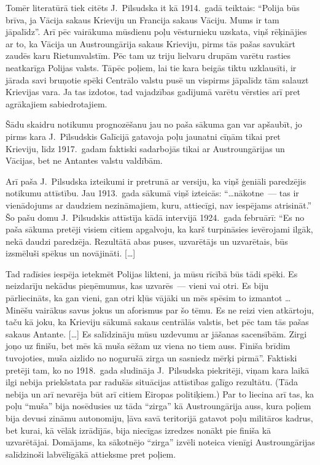 \documentclass[twoside,a5paper,12pt,fleqn,openany]{extbook}
\newcommand{\citespace}{[\dots{}]}
\begin{document}
Tomēr literatūrā tiek citēts J.~Pilsudska it kā 1914.~gadā teiktais: ``Polija būs brīva, ja Vācija sakaus Krieviju un Francija sakaus Vāciju. Mums ir tam jāpalīdz''. Arī pēc vairākuma mūsdienu poļu vēsturnieku uzskata, viņš rēķinājies ar to, ka Vācija un Austroungārija sakaus Krieviju, pirms tās pašas savukārt zaudēs karu Rietumvalstīm. Pēc tam uz triju lielvaru drupām varētu rasties neatkarīga Polijas valsts. Tāpēc poļiem, lai tie kara beigās tiktu uzklausīti, ir jārada savi bruņotie spēki Centrālo valstu pusē un vispirms jāpalīdz tām salauzt Krievijas vara. Ja tas izdotos, tad vajadzības gadījumā varētu vērsties arī pret agrākajiem sabiedrotajiem.

Šādu skaidru notikumu prognozēšanu jau no paša sākuma gan var apšaubīt, jo pirms kara J.~Pilsudskis Galīcijā gatavoja poļu jaunatni cīņām tikai pret Krieviju, līdz 1917.~gadam faktiski sadarbojās tikai ar Austroungārijas un Vācijas, bet ne Antantes valstu valdībām.

Arī paša J.~Pilsudska izteikumi ir pretrunā ar versiju, ka viņš ģeniāli paredzējis notikumu attīstību. Jau 1913.~gada sākumā viņš izteicās: ``\dots{}nākotne~--- tas ir vienādojums ar daudziem nezināmajiem, kuru, attiecīgi, nav iespējams atrisināt.'' Šo pašu domu J.~Pilsudskis attīstīja kādā intervijā 1924.~gada februārī: ``Es no paša sākuma pretēji visiem citiem apgalvoju, ka karš turpināsies ievērojami ilgāk, nekā daudzi paredzēja. Rezultātā abas puses, uzvarētājs un uzvarētais, būs izsmēluši spēkus un novājināti. \citespace{}

Tad radīsies iespēja ietekmēt Polijas likteni, ja mūsu rīcībā būs tādi spēki. Es neizdarīju nekādus pieņēmumus, kas uzvarēs~--- vieni vai otri. Es biju pārliecināts, ka gan vieni, gan otri kļūs vājāki un mēs spēsim to izmantot \dots{} Minēšu vairākus savus jokus un aforismus par šo tēmu. Es ne reizi vien atkārtoju, taču kā joku, ka Krieviju sākumā sakaus centrālās valstis, bet pēc tam tās pašas sakaus Antante. \citespace{} Es salīdzināju mūsu uzdevumu ar jāšanas sacensībām. Zirgi joņo uz finišu, bet mēs kā muša sēžam uz viena no tiem auss. Finiša brīdim tuvojoties, muša aizlido no nogurušā zirga un sasniedz mērķi pirmā''. Faktiski pretēji tam, ko no 1918.~gada sludināja J.~Pilsudska piekritēji, viņam kara laikā ilgi nebija priekšstata par radušās situācijas attīstības galīgo rezultātu. (Tāda nebija un arī nevarēja būt arī citiem Eiropas politiķiem.) Par to liecina arī tas, ka poļu ``muša'' bija nosēdusies uz tāda ``zirga'' kā Austroungārija auss, kura poļiem bija devusi zināmu autonomiju, ļāva savā teritorijā gatavot poļu militāros kadrus, bet kurai, kā vēlāk izrādījās, bija niecīgas izredzes nonākt pie finiša kā uzvarētājai. Domājams, ka sākotnējo ``zirga'' izvēli noteica vienīgi Austroungārijas salīdzinoši labvēlīgākā attieksme pret poļiem.
\end{document}
